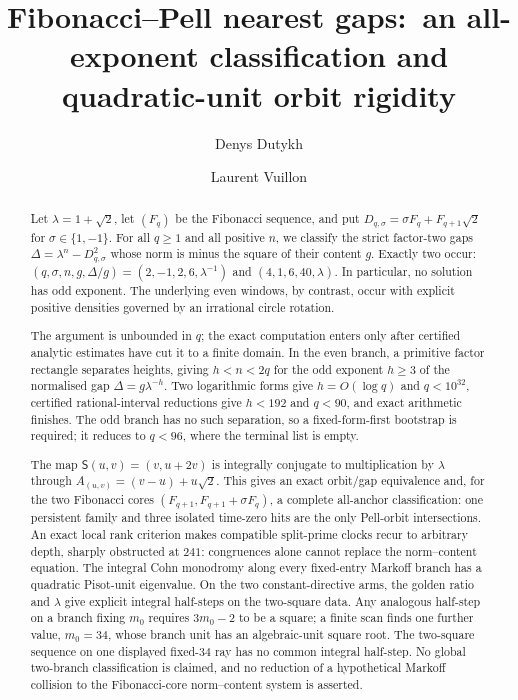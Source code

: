 \documentclass[11pt,reqno]{amsart}
\title[Fibonacci--Pell nearest gaps]{Fibonacci--Pell nearest gaps:\ an all-exponent classification and quadratic-unit orbit rigidity}
\author{Denys Dutykh}
\author{Laurent Vuillon}
\theoremstyle{definition}
\begin{document}
\begin{abstract}
Let $\lambda=1+\sqrt2$, let $(F_q)$ be the Fibonacci sequence, and put
$D_{q,\sigma}=\sigma F_q+F_{q+1}\sqrt2$ for
$\sigma\in\{1,-1\}$. For all $q\geqslant1$ and all positive $n$, we classify the strict
factor-two gaps $\Delta=\lambda^n-D_{q,\sigma}^2$ whose norm is minus the
square of their content $g$. Exactly two occur:
$(q,\sigma,n,g,\Delta/g)=(2,-1,2,6,\lambda^{-1})$ and
$(4,1,6,40,\lambda)$. In particular, no solution has odd exponent. The underlying even windows, by contrast, occur with explicit positive
densities governed by an irrational circle rotation.

The argument is unbounded in $q$; the exact computation enters only after
certified analytic estimates have cut it to a finite domain. In the even
branch, a primitive factor rectangle separates heights, giving $h<n<2q$ for
the odd exponent $h\geqslant3$ of the normalised gap $\Delta=g\lambda^{-h}$.
Two logarithmic forms give $h=O(\log q)$ and $q<10^{32}$, certified
rational-interval reductions give $h<192$ and $q<90$, and exact arithmetic
finishes. The odd branch has no such separation,
so a fixed-form-first bootstrap is required; it reduces to $q<96$, where the
terminal list is empty.

The map $\mathsf S(u,v)=(v,u+2v)$ is integrally conjugate to multiplication
by $\lambda$ through $A_{(u,v)}=(v-u)+u\sqrt2$. This gives an exact orbit/gap
equivalence and, for the two Fibonacci cores $(F_{q+1},F_{q+1}+\sigma F_q)$,
a complete all-anchor classification: one persistent family and three
isolated time-zero hits are the only Pell-orbit intersections. An exact local rank criterion makes compatible split-prime
clocks recur to arbitrary depth, sharply obstructed at $241$: congruences
alone cannot replace the norm--content equation. The integral Cohn monodromy
along every fixed-entry Markoff branch has a quadratic Pisot-unit eigenvalue.
On the two constant-directive arms, the golden ratio and $\lambda$ give
explicit integral half-steps on the two-square data.
Any analogous half-step on a branch fixing $m_0$ requires $3m_0-2$ to be a
square; a finite scan finds one further value, $m_0=34$, whose branch unit has
an algebraic-unit square root. The two-square sequence on one displayed
fixed-$34$ ray has no common integral half-step. No global two-branch
classification is claimed, and no reduction of a hypothetical Markoff
collision to the Fibonacci-core norm--content system is asserted.
\end{abstract}
\end{document}
